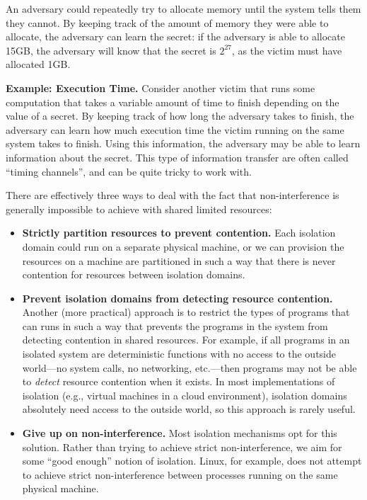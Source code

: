 \documentclass[
  letterpaper,
]{scrbook}
\theoremstyle{definition}
\theoremstyle{plain}
\theoremstyle{plain}
\theoremstyle{remark}
\begin{document}
An adversary could repeatedly try to allocate memory until the system
tells them they cannot. By keeping track of the amount of memory they
were able to allocate, the adversary can learn the secret: if the
adversary is able to allocate 15GB, the adversary will know that the
secret is \(2^{27}\), as the victim must have allocated 1GB.

\textbf{Example: Execution Time.} Consider another victim that runs some
computation that takes a variable amount of time to finish depending on
the value of a secret. By keeping track of how long the adversary takes
to finish, the adversary can learn how much execution time the victim
running on the same system takes to finish. Using this information, the
adversary may be able to learn information about the secret. This type
of information transfer are often called ``timing channels'', and can be
quite tricky to work with.

There are effectively three ways to deal with the fact that
non-interference is generally impossible to achieve with shared limited
resources:

\begin{itemize}
\item
  \textbf{Strictly partition resources to prevent contention.} Each
  isolation domain could run on a separate physical machine, or we can
  provision the resources on a machine are partitioned in such a way
  that there is never contention for resources between isolation
  domains.
\item
  \textbf{Prevent isolation domains from detecting resource contention.}
  Another (more practical) approach is to restrict the types of programs
  that can runs in such a way that prevents the programs in the system
  from detecting contention in shared resources. For example, if all
  programs in an isolated system are deterministic functions with no
  access to the outside world---no system calls, no networking,
  etc.---then programs may not be able to \emph{detect} resource
  contention when it exists. In most implementations of isolation (e.g.,
  virtual machines in a cloud environment), isolation domains absolutely
  need access to the outside world, so this approach is rarely useful.
\item
  \textbf{Give up on non-interference.} Most isolation mechanisms opt
  for this solution. Rather than trying to achieve strict
  non-interference, we aim for some ``good enough'' notion of isolation.
  Linux, for example, does not attempt to achieve strict
  non-interference between processes running on the same physical
  machine.
\end{itemize}
\end{document}
